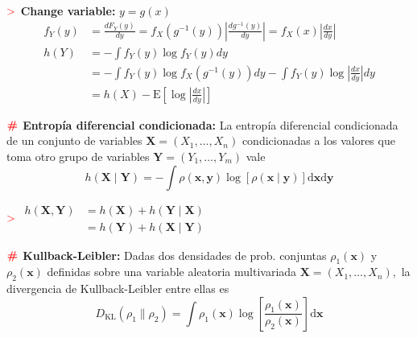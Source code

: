 \documentclass[%
 reprint,
 amsmath,amssymb,
 aps,
]{revtex4-1}
\begin{document}
\textbf{$\textcolor{red}{\mathbf{>}}$ Change variable:} $y=g(x)$
$$
\begin{aligned}
  f_{Y}(y)&=\frac{d F_{Y}(y)}{d y} =f_{X}\left(g^{-1}(y)\right)\left|\frac{d g^{-1}(y)}{d y}\right|=f_{X}(x)\left|\frac{d x}{d y}\right| \\
  h(Y) &=-\int f_{Y}(y) \log f_{Y}(y) d y \\
  &=-\int f_{Y}(y) \log f_{X}\left(g^{-1}(y)\right) d y-\int f_{Y}(y) \log \left|\frac{d x}{d y}\right| d y \\
  &=h(X)-\mathrm{E}\left[\log \left|\frac{d x}{d y}\right|\right]
\end{aligned}
$$

\textbf{$\color{red}{\textbf{\#}}$ Entropía diferencial condicionada:} 
La entropía diferencial condicionada de un conjunto de variables $\boldsymbol{X} =\left(X_{1}, \ldots, X_{n}\right)$ condicionadas a los valores que toma otro grupo de variables $\boldsymbol{Y}=\left(Y_{1}, \ldots, Y_{m}\right)$ vale
$$
h(\boldsymbol{X} \mid \boldsymbol{Y})=-\int \rho(\boldsymbol{x}, \boldsymbol{y}) \log [\rho(\boldsymbol{x} \mid \boldsymbol{y})] \mathrm{d} \boldsymbol{x} \mathrm{d} \boldsymbol{y}
$$

\textbf{$\textcolor{red}{\mathbf{>}}$}
$
\begin{aligned}
  h(\boldsymbol{X}, \boldsymbol{Y})&=h(\boldsymbol{X})+h(\boldsymbol{Y} \mid \boldsymbol{X}) \\
  &=h(\boldsymbol{Y})+h(\boldsymbol{X} \mid \boldsymbol{Y})
\end{aligned}
$

\textbf{$\color{red}{\textbf{\#}}$ Kullback-Leibler:} 
Dadas dos densidades de prob. conjuntas $\rho_{1}(\boldsymbol{x})$ y $\rho_{2}(\boldsymbol{x})$ definidas sobre una variable aleatoria multivariada $\boldsymbol{X}=\left(X_{1}, \ldots, X_{n}\right),$ la divergencia de Kullback-Leibler entre ellas es
$$
D_{\mathrm{KL}}\left(\rho_{1} \| \rho_{2}\right)=\int \rho_{1}(\boldsymbol{x}) \log \left[\frac{\rho_{1}(\boldsymbol{x})}{\rho_{2}(\boldsymbol{x})}\right] \mathrm{d} \boldsymbol{x}
$$
\end{document}
